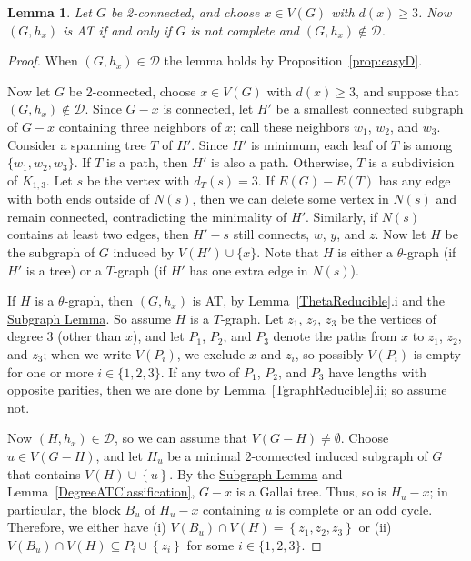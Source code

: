 \documentclass[12pt]{article}
\theoremstyle{plain}
\newtheorem{lem}[thm]{Lemma}
\theoremstyle{definition}
\theoremstyle{remark}
\newcommand{\fancy}[1]{\mathcal{#1}}
\newcommand{\D}{\fancy{D}}
\newcommand{\set}[1]{\left\{ #1 \right\}}
\def\D{\fancy{D}}
\begin{document}
	\begin{lem}
		\label{TwoConnectedClassification}
		Let $G$ be 2-connected, and choose $x\in V(G)$ with $d(x)\ge 3$. 
		Now $(G,h_x)$ is AT if and only if $G$ is not complete and $(G,h_x) \not \in \D$.
	\end{lem}
	\begin{proof}
		When $(G,h_x)\in \D$ the lemma holds by Proposition~\ref{prop:easyD}.  
		
		Now let $G$ be 2-connected, choose $x\in V(G)$ with $d(x)\ge 3$, and suppose that
		$(G,h_x)\notin \D$.  Since $G-x$ is connected, let $H'$ be a smallest connected
		subgraph of $G-x$ containing three neighbors of $x$; call these neighbors $w_1$,
		$w_2$, and $w_3$.  Consider a spanning tree $T$ of $H'$.  Since $H'$ is minimum,
		each leaf of $T$ is among $\{w_1, w_2, w_3\}$.  If $T$ is a path, then $H'$ is also a
		path.  Otherwise, $T$ is a subdivision of $K_{1,3}$.  Let $s$ be the vertex with
		$d_T(s)=3$.  If $E(G)-E(T)$ has any edge with both ends outside of $N(s)$, then
		we can delete some vertex in $N(s)$ and remain connected, contradicting the
		minimality of $H'$.  Similarly, if $N(s)$ contains at least two edges, then
		$H'-s$ still connects, $w$, $y$, and $z$.  Now let $H$ be the subgraph of $G$
		induced by $V(H')\cup\{x\}$.  Note that $H$ is either a $\theta$-graph (if $H'$
		is a tree) or a $T$-graph (if $H'$ has one extra edge in $N(s)$).  
		
		If $H$ is a $\theta$-graph, then $(G,h_x)$ is AT, by
		Lemma~\ref{ThetaReducible}.i and 
		the \hyperlink{target:InducedSubgraph}{Subgraph Lemma}.
		So assume $H$ is a $T$-graph.  Let $z_1$, $z_2$, $z_3$ be the vertices
		of degree 3 (other than $x$), and let $P_1$, $P_2$, and $P_3$ denote the paths
		from $x$ to $z_1$, $z_2$, and $z_3$; when we write $V(P_i)$, we exclude $x$ and
		$z_i$, so possibly $V(P_i)$ is empty for one or more $i\in\{1,2,3\}$.
		If any two of $P_1$, $P_2$, and $P_3$ have lengths with opposite parities, then
		we are done by Lemma~\ref{TgraphReducible}.ii; so assume not.  
		
		Now $(H,h_x)\in \D$, so we can assume that $V(G-H) \ne \emptyset$.  Choose $u
		\in V(G-H)$, and let $H_u$ be a minimal $2$-connected induced subgraph of $G$
		that contains $V(H) \cup \set{u}$.  By the \hyperlink{target:InducedSubgraph}{Subgraph Lemma} and Lemma~\ref{DegreeATClassification}, $G-x$ is a Gallai tree. 
		Thus, so is $H_u-x$; in particular, the block $B_u$ of $H_u-x$ containing $u$
		is complete or an odd cycle.  Therefore, we either have (i) $V(B_u) \cap V(H) =
		\set{z_1, z_2,z_3}$ or (ii)  $V(B_u) \cap V(H) \subseteq P_i \cup \set{z_i}$
		for some $i \in \{1,2,3\}$.
		

\end{proof}
\end{document}
